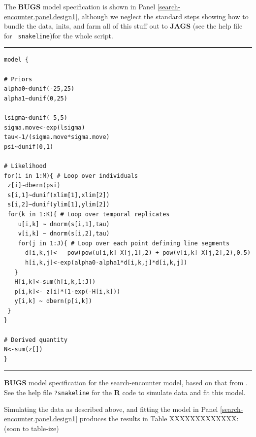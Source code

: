 The {\bf BUGS} model specification is shown in Panel 
\ref{search-encounter.panel.design1}, although we neglect the standard
steps showing how to 
bundle the data, inits, and farm
all of this stuff out to {\bf JAGS} (see the help file for \mbox{\tt
  snakeline})for the whole script.

\begin{panel}[htp]
\centering
\rule[0.15in]{\textwidth}{.03in}
{\small
\begin{verbatim}
model {

# Priors
alpha0~dunif(-25,25)
alpha1~dunif(0,25)

lsigma~dunif(-5,5)
sigma.move<-exp(lsigma)
tau<-1/(sigma.move*sigma.move)
psi~dunif(0,1)

# Likelihood
for(i in 1:M){ # Loop over individuals
 z[i]~dbern(psi)
 s[i,1]~dunif(xlim[1],xlim[2])
 s[i,2]~dunif(ylim[1],ylim[2])
 for(k in 1:K){ # Loop over temporal replicates
    u[i,k] ~ dnorm(s[i,1],tau)
    v[i,k] ~ dnorm(s[i,2],tau)
    for(j in 1:J){ # Loop over each point defining line segments
      d[i,k,j]<-  pow(pow(u[i,k]-X[j,1],2) + pow(v[i,k]-X[j,2],2),0.5)
      h[i,k,j]<-exp(alpha0-alpha1*d[i,k,j]*d[i,k,j])
   }
   H[i,k]<-sum(h[i,k,1:J])
   p[i,k]<- z[i]*(1-exp(-H[i,k]))
   y[i,k] ~ dbern(p[i,k])
 }
}

# Derived quantity
N<-sum(z[])
}
\end{verbatim}
}
\rule[-0.15in]{\textwidth}{.03in}
\caption{
{\bf BUGS} model specification for the search-encounter model, based
on that from \citet{royle_etal:2011mee}. 
See the 
help file \mbox{\tt ?snakeline} for the {\bf R} code to simulate data
and fit this model. 
}
\label{search-encounter.panel.design1}
\end{panel}


Simulating the data as described above, and fitting the model in Panel
\ref{search-encounter.panel.design1} produces the results in Table
XXXXXXXXXXXXX: (soon to table-ize)

